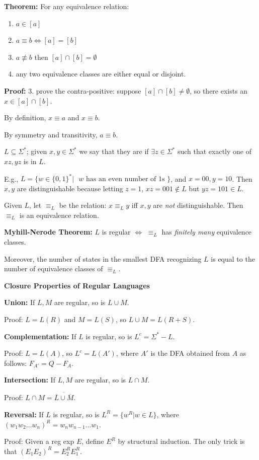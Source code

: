 \begin{frame}

{\bf Theorem:}  For any equivalence relation:
\begin{enumerate}
\item  $a\in[a]$
\item  $a\equiv b\iff [a]=[b]$
\item  $a\not\equiv b$ then $[a]\cap[b]=\emptyset$
\item  any two equivalence classes are either equal or disjoint.
\end{enumerate}

{\bf Proof:}  3. prove the contra-positive: suppose
$[a]\cap[b]\neq\emptyset$, so there exists an $x\in[a]\cap[b]$.  

By definition, $x\equiv a$ and $x\equiv b$.  

By symmetry and transitivity, $a\equiv b$.
\end{frame}

\begin{frame}

$L\subseteq\Sigma^*$;
given $x,y\in\Sigma^*$ we say that they are  if
$\exists z\in\Sigma^*$ such that exactly one of $xz,yz$ is in $L$.

E.g., $L=\{w\in\{0,1\}^*|\text{ $w$ has an even number of 1s }\}$, and
$x=00,y=10$.  Then $x,y$ are distinguishable because letting $z=1$,
$xz=001\not\in L$ but $yz=101\in L$.

Given $L$, let $\equiv_L$ be the relation: $x\equiv_Ly$ iff $x,y$ are
{\em not} distinguishable.  Then $\equiv_L$ is an equivalence
relation.

{\bf Myhill-Nerode Theorem:}  $L$ is regular $\iff$ $\equiv_L$ has
{\em finitely many} equivalence classes.

Moreover, the number of states in the smallest
DFA recognizing $L$ is equal to the number of
equivalence classes of $\equiv_L$.
\end{frame}

\begin{frame}

{\bf Closure Properties of Regular Languages}

{\bf Union:} If $L,M$ are regular, so is $L\cup M$.

Proof: $L=L(R)$ and $M=L(S)$, so $L\cup M=L(R+S)$.

{\bf Complementation:} If $L$ is regular, so is $L^c=\Sigma^*-L$.

Proof: $L=L(A)$, so $L^c=L(A')$, where $A'$ is the DFA obtained from
$A$ as follows: $F_{A'}=Q-F_A$.

{\bf Intersection:} If $L,M$ are regular, so is $L\cap M$.

Proof: $L\cap M=\overline{\overline{L}\cup\overline{M}}$. 

{\bf Reversal:} If $L$ is regular, so is $L^R=\{w^R|w\in L\}$,
where $(w_1w_2\ldots w_n)^R=w_nw_{n-1}\ldots w_1$.

Proof:  Given a reg exp $E$, define $E^R$ by structural induction.
The only trick is that $(E_1E_2)^R=E_2^RE_1^R$.
\end{frame}

